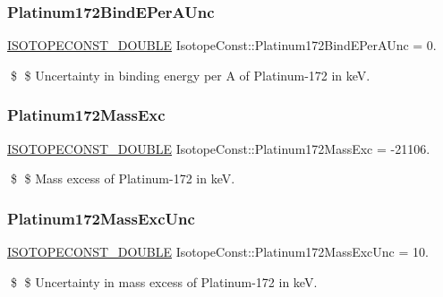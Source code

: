 \subsubsection{\texorpdfstring{Platinum172\+Bind\+E\+Per\+A\+Unc}{Platinum172BindEPerAUnc}}
{\footnotesize\ttfamily \mbox{\hyperlink{group___isotope_const-_macros_ga8f45a7272ce02c0b4c65c44636ed719a}{I\+S\+O\+T\+O\+P\+E\+C\+O\+N\+S\+T\+\_\+\+D\+O\+U\+B\+LE}} Isotope\+Const\+::\+Platinum172\+Bind\+E\+Per\+A\+Unc = 0.}

\$ \$ Uncertainty in binding energy per A of Platinum-\/172 in keV. \mbox{\label{group___isotope_const-_platinum-_pt172_ga5dade82ec137486c78f650cb0347925e}} 
\subsubsection{\texorpdfstring{Platinum172\+Mass\+Exc}{Platinum172MassExc}}
{\footnotesize\ttfamily \mbox{\hyperlink{group___isotope_const-_macros_ga8f45a7272ce02c0b4c65c44636ed719a}{I\+S\+O\+T\+O\+P\+E\+C\+O\+N\+S\+T\+\_\+\+D\+O\+U\+B\+LE}} Isotope\+Const\+::\+Platinum172\+Mass\+Exc = -\/21106.}

\$ \$ Mass excess of Platinum-\/172 in keV. \mbox{\label{group___isotope_const-_platinum-_pt172_ga5de499710f35c963ac0c4c0349d99034}} 
\subsubsection{\texorpdfstring{Platinum172\+Mass\+Exc\+Unc}{Platinum172MassExcUnc}}
{\footnotesize\ttfamily \mbox{\hyperlink{group___isotope_const-_macros_ga8f45a7272ce02c0b4c65c44636ed719a}{I\+S\+O\+T\+O\+P\+E\+C\+O\+N\+S\+T\+\_\+\+D\+O\+U\+B\+LE}} Isotope\+Const\+::\+Platinum172\+Mass\+Exc\+Unc = 10.}

\$ \$ Uncertainty in mass excess of Platinum-\/172 in keV. \mbox{\label{group___isotope_const-_platinum-_pt172_gad1b6254dd90540df8d07b41da8d48ba6}} 
